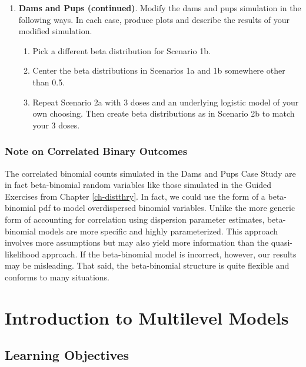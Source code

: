 \documentclass[
]{krantz}
\providecommand{\tightlist}{%
  \setlength{\itemsep}{0pt}\setlength{\parskip}{0pt}}
\begin{document}
\begin{enumerate}
\def\labelenumi{\arabic{enumi}.}
\setcounter{enumi}{1}
\item
  \textbf{Dams and Pups (continued)}. Modify the dams and pups simulation in the following ways. In each case, produce plots and describe the results of your modified simulation.

  \begin{enumerate}
  \def\labelenumii{\alph{enumii}.}
  \tightlist
  \item
    Pick a different beta distribution for Scenario 1b.
  \item
    Center the beta distributions in Scenarios 1a and 1b somewhere other than 0.5.
  \item
    Repeat Scenario 2a with 3 doses and an underlying logistic model of your own choosing. Then create beta distributions as in Scenario 2b to match your 3 doses.
  \end{enumerate}
\end{enumerate}

\hypertarget{note-on-correlated-binary-outcomes}{%
\subsection{Note on Correlated Binary Outcomes}\label{note-on-correlated-binary-outcomes}}

The correlated binomial counts simulated in the Dams and Pups Case Study are in fact beta-binomial random variables like those simulated in the Guided Exercises from Chapter \ref{ch-distthry}. In fact, we could use the form of a beta-binomial pdf to model overdispersed binomial variables. Unlike the more generic form of accounting for correlation using dispersion parameter estimates, beta-binomial models are more specific and highly parameterized. This approach involves more assumptions but may also yield more information than the quasi-likelihood approach. If the beta-binomial model is incorrect, however, our results may be misleading. That said, the beta-binomial structure is quite flexible and conforms to many situations.

\hypertarget{ch-multilevelintro}{%
\chapter{Introduction to Multilevel Models}\label{ch-multilevelintro}}

\hypertarget{learning-objectives-7}{%
\section{Learning Objectives}\label{learning-objectives-7}}
\end{document}
